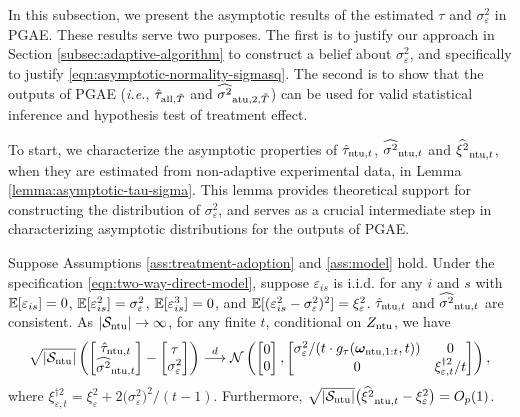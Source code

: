 In this subsection, we present the asymptotic results of the estimated $\tau$ and $\sigma^2_\varepsilon$ in PGAE. These results serve two purposes. The first is to justify our approach in Section \ref{subsec:adaptive-algorithm} to construct a belief about $\sigma^2_\varepsilon$, and specifically to justify \eqref{eqn:asymptotic-normality-sigmasq}. The second is to show that the outputs of PGAE ({\it i.e.}, $\hat{\tau}_{\mathrm{all},\tilde{T}}$ and $\widehat{\sigma^2}_{\mathrm{atu},2,\tilde{T}}$) can be used for valid statistical inference and hypothesis test of treatment effect.


{\blue
To start, we characterize the asymptotic properties of $\hat{\tau}_{\mathrm{ntu},t}$, $\widehat{\sigma^2}_{\mathrm{ntu},t}$ and $\widehat{\xi^2}_{\mathrm{ntu},t}$, when they are estimated from non-adaptive experimental data, in Lemma \ref{lemma:asymptotic-tau-sigma}. This lemma provides theoretical support for constructing the  distribution of $\sigma_\varepsilon^2$, and serves as a crucial intermediate step in characterizing asymptotic distributions for the outputs of PGAE. 


\begin{lemma}\label{lemma:asymptotic-tau-sigma}
Suppose Assumptions \ref{ass:treatment-adoption} and \ref{ass:model} hold. Under the specification \eqref{eqn:two-way-direct-model}, suppose $\varepsilon_{is}$ is i.i.d. for any $i$ and $s$ with $\mathbb{E}[\varepsilon_{is}] = 0$, $\mathbb{E}[\varepsilon^2_{is}] = \sigma_\varepsilon^2$, $\mathbb{E}[\varepsilon^3_{is}] = 0$,  and $\mathbb{E}[(\varepsilon^2_{is} - \sigma^2_\varepsilon)^2] = \xi^2_{\varepsilon}$. $\hat{\tau}_{\mathrm{ntu},t}$ and $\widehat{\sigma^2}_{\mathrm{ntu},t}$ are consistent. As $|\mathcal{S}_{\mathrm{ntu}}| \rightarrow \infty$, for any finite $t$, conditional on $Z_{\mathrm{ntu}}$, we have 
\[\sqrt{|\mathcal{S}_{\mathrm{ntu}}|} \left(\begin{bmatrix} \hat{\tau}_{\mathrm{ntu},t} \\ \widehat{\sigma^2}_{\mathrm{ntu},t} \end{bmatrix}  - \begin{bmatrix} \tau \\ \sigma^2_\varepsilon  \end{bmatrix}\right)  \stackrel{d}{\longrightarrow } \mathcal{N} \left(\begin{bmatrix} 0 \\ 0 \end{bmatrix}, \begin{bmatrix} \sigma_\varepsilon^2/(t \cdot g_\tau(\bm{\omega}_{\mathrm{ntu}, 1:t}, t)) & 0 \\  0 & \xi_{\varepsilon,t}^{\dagger2}/t \end{bmatrix} \right), \]
where $\xi_{\varepsilon,t}^{\dagger2} = \xi^2_\varepsilon + 2 \big(\sigma_\varepsilon^2\big)^2/(t-1)$. Furthermore, 
$\sqrt{|\mathcal{S}_{\mathrm{ntu}}|} \big(\widehat{\xi^2}_{\mathrm{ntu},t} - \xi_\varepsilon^2\big) = O_p(1)$.
\end{lemma}

}
